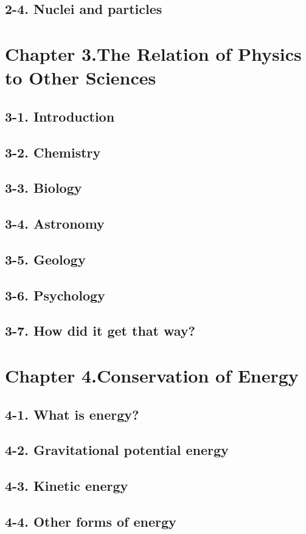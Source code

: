 \documentclass{article}
\begin{document}
\subsection{2-4. Nuclei and particles}
\section{Chapter 3.The Relation of Physics to Other Sciences}
\subsection{3-1. Introduction}
\subsection{3-2. Chemistry}
\subsection{3-3. Biology}
\subsection{3-4. Astronomy}
\subsection{3-5. Geology}
\subsection{3-6. Psychology}
\subsection{3-7. How did it get that way?}
\section{Chapter 4.Conservation of Energy}
\subsection{4-1. What is energy?}
\subsection{4-2. Gravitational potential energy}
\subsection{4-3. Kinetic energy}
\subsection{4-4. Other forms of energy}
\end{document}
